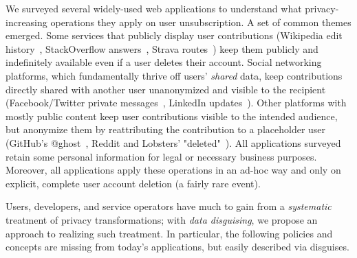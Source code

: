 %
We surveyed several widely-used web applications to understand what privacy-increasing operations
they apply on user unsubscription.
%
A set of common themes emerged.
%
Some services that publicly display user contributions (\eg Wikipedia edit
history~\cite{wikipedia:privacy}, StackOverflow answers~\cite{stackoverflow:privacy},
Strava routes~\cite{strava:privacy}) keep them publicly and indefinitely available even if a user deletes
their account.
%
Social networking platforms, which fundamentally thrive off users' \emph{shared} data, keep
contributions directly shared with another user unanonymized and visible to the recipient
(\eg Facebook/Twitter private messages~\cite{facebook:privacy, twitter:privacy},
LinkedIn updates~\cite{linkedin:privacy}).
%
Other platforms with mostly public content keep user contributions visible to the intended audience,
but anonymize them by reattributing the contribution to a placeholder user (\eg GitHub's
@ghost~\cite{github:privacy}, Reddit and Lobsters'
"deleted"~\cite{reddit:privacy, lobsters:privacy}).
%
%
All applications surveyed retain some personal information for legal or necessary business
purposes.
%
Moreover, all applications apply these operations in an ad-hoc way  and only on explicit, complete user account deletion (a fairly rare event).
%

%
Users, developers, and service operators have much to gain from a
\emph{systematic} treatment of privacy transformations; with \emph{data disguising}, we
propose an approach to realizing such treatment.
%
In particular, the following policies and concepts are missing from today's applications, but
easily described via disguises.
%

